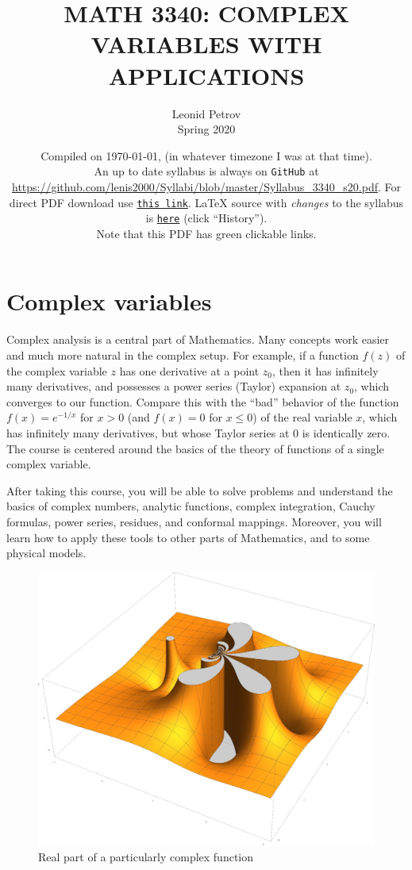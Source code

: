 \documentclass[oneside,11pt]{amsart}
\begin{document}
\title[MATH 3340: COMPLEX VARIABLES WITH APPLICATIONS]{MATH 3340: COMPLEX VARIABLES WITH APPLICATIONS}
\author{Leonid Petrov\\Spring 2020}
\date{Compiled on \today, \currenttime{} (in whatever timezone I was at that time).\\An up to date syllabus is always on \texttt{GitHub} at \url{https://github.com/lenis2000/Syllabi/blob/master/Syllabus_3340_s20.pdf}. For direct PDF download use \href{https://github.com/lenis2000/Syllabi/raw/master/Syllabus_3340_s20.pdf}{\texttt{this link}}.
	\LaTeX{} source with \textit{changes} to the syllabus is \href{https://github.com/lenis2000/Syllabi/blob/master/Syllabus_3340_s20.tex}{\texttt{here}}
(click ``History'').
\\Note that this PDF has green clickable links.}
\maketitle

\section{Complex variables}

Complex analysis is a central part of 
Mathematics. Many concepts work easier and much more natural
in the complex setup. For example, if a function $f(z)$ 
of the complex variable $z$
has one 
derivative at a point $z_0$, then it has infinitely many derivatives,
and possesses a power series (Taylor) expansion at $z_0$, which converges to our function. 
Compare this with the “bad” behavior of the function 
$f(x)=e^{-1/x}$ for $x>0$ (and $f(x)=0$ for $x\le 0$) of the real variable $x$,
which has infinitely many derivatives, but whose Taylor series at $0$ is 
identically zero.
The course is centered around the basics of the theory of functions of a
single complex variable.

\medskip

After taking this course, you 
will be able to solve problems and understand the 
basics of
complex numbers, analytic functions, 
complex integration, Cauchy formulas, power series, 
residues, and conformal mappings.
Moreover, you will learn how to apply these tools to 
other parts of Mathematics, and to some physical models.

\begin{figure}[h]
	\includegraphics[height=.45\textwidth]{img/complex_f.jpg}
	\caption{Real part of a particularly complex function}
\end{figure}
\end{document}

